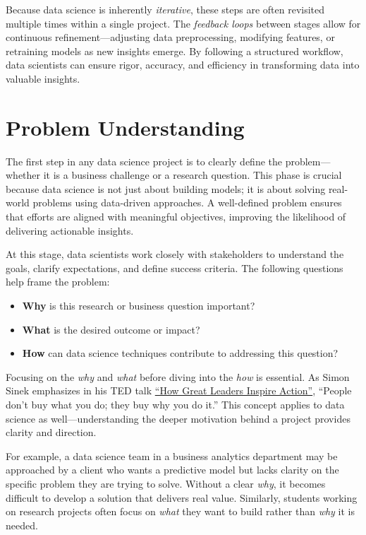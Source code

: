 \documentclass[
  11pt,
]{book}
\providecommand{\tightlist}{%
  \setlength{\itemsep}{0pt}\setlength{\parskip}{0pt}}
\theoremstyle{definition}
\theoremstyle{definition}
\theoremstyle{definition}
\theoremstyle{definition}
\theoremstyle{remark}
\begin{document}
Because data science is inherently \emph{iterative}, these steps are often revisited multiple times within a single project. The \emph{feedback loops} between stages allow for continuous refinement---adjusting data preprocessing, modifying features, or retraining models as new insights emerge. By following a structured workflow, data scientists can ensure rigor, accuracy, and efficiency in transforming data into valuable insights.

\section{Problem Understanding}\label{problem-understanding}

The first step in any data science project is to clearly define the problem---whether it is a business challenge or a research question. This phase is crucial because data science is not just about building models; it is about solving real-world problems using data-driven approaches. A well-defined problem ensures that efforts are aligned with meaningful objectives, improving the likelihood of delivering actionable insights.

At this stage, data scientists work closely with stakeholders to understand the goals, clarify expectations, and define success criteria. The following questions help frame the problem:

\begin{itemize}
\tightlist
\item
  \textbf{Why} is this research or business question important?\\
\item
  \textbf{What} is the desired outcome or impact?\\
\item
  \textbf{How} can data science techniques contribute to addressing this question?
\end{itemize}

Focusing on the \emph{why} and \emph{what} before diving into the \emph{how} is essential. As Simon Sinek emphasizes in his TED talk \href{https://www.ted.com/talks/simon_sinek_how_great_leaders_inspire_action?utm_campaign=tedspread&utm_medium=referral&utm_source=tedcomshare}{``How Great Leaders Inspire Action''}, ``People don't buy what you do; they buy why you do it.'' This concept applies to data science as well---understanding the deeper motivation behind a project provides clarity and direction.

For example, a data science team in a business analytics department may be approached by a client who wants a predictive model but lacks clarity on the specific problem they are trying to solve. Without a clear \emph{why}, it becomes difficult to develop a solution that delivers real value. Similarly, students working on research projects often focus on \emph{what} they want to build rather than \emph{why} it is needed.
\end{document}
